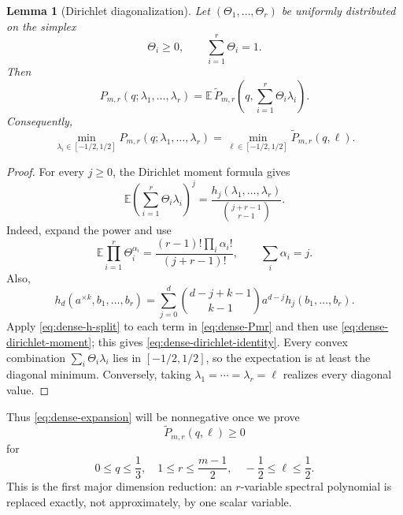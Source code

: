\documentclass[11pt]{article}
\newtheorem{lemma}[theorem]{Lemma}
\newcommand{\E}{\mathbb E}
\begin{document}
\begin{lemma}[Dirichlet diagonalization]\label{lem:dense-dirichlet}
Let \((\Theta_1,\ldots,\Theta_r)\) be uniformly distributed on the simplex
\[
       \Theta_i\ge0,\qquad \sum_{i=1}^r\Theta_i=1.
\]
Then
\begin{equation}\label{eq:dense-dirichlet-identity}
 P_{m,r}(q;\lambda_1,\ldots,\lambda_r)
 =\E\,\widetilde P_{m,r}
       \left(q,\sum_{i=1}^r\Theta_i\lambda_i\right).
\end{equation}
Consequently,
\begin{equation}\label{eq:dense-diagonal-min}
 \min_{\lambda_i\in[-1/2,1/2]}
 P_{m,r}(q;\lambda_1,\ldots,\lambda_r)
 =\min_{\ell\in[-1/2,1/2]}\widetilde P_{m,r}(q,\ell).
\end{equation}
\end{lemma}

\begin{proof}
For every \(j\ge0\), the Dirichlet moment formula gives
\begin{equation}\label{eq:dense-dirichlet-moment}
 \E\left(\sum_{i=1}^r\Theta_i\lambda_i\right)^j
 =\frac{h_j(\lambda_1,\ldots,\lambda_r)}
        {\binom{j+r-1}{r-1}}.
\end{equation}
Indeed, expand the power and use
\[
 \E\prod_{i=1}^r\Theta_i^{\alpha_i}
 =\frac{(r-1)!\prod_i\alpha_i!}{(j+r-1)!},
 \qquad \sum_i\alpha_i=j.
\]
Also,
\begin{equation}\label{eq:dense-h-split}
 h_d(a^{\times k},b_1,\ldots,b_r)
 =\sum_{j=0}^d
   \binom{d-j+k-1}{k-1}a^{d-j}h_j(b_1,\ldots,b_r).
\end{equation}
Apply \eqref{eq:dense-h-split} to each term in \eqref{eq:dense-Pmr} and then
use \eqref{eq:dense-dirichlet-moment}; this gives
\eqref{eq:dense-dirichlet-identity}.  Every convex combination
\(\sum_i\Theta_i\lambda_i\) lies in \([-1/2,1/2]\), so the expectation is
at least the diagonal minimum.  Conversely, taking
\(\lambda_1=\cdots=\lambda_r=\ell\) realizes every diagonal value.
\end{proof}

Thus \eqref{eq:dense-expansion} will be nonnegative once we prove
\begin{equation}\label{eq:dense-diagonal-target}
       \widetilde P_{m,r}(q,\ell)\ge0
\end{equation}
for
\[
 0\le q\le\frac13,
 \quad 1\le r\le\frac{m-1}{2},
 \quad -\frac12\le\ell\le\frac12.
\]
This is the first major dimension reduction: an \(r\)-variable spectral
polynomial is replaced exactly, not approximately, by one scalar variable.
\end{document}
